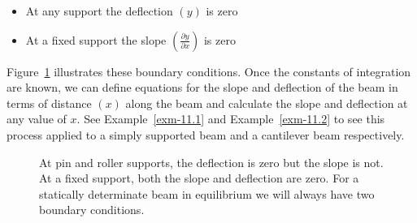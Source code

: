 \documentclass[
  letterpaper,
  DIV=11,
  numbers=noendperiod]{scrreprt}
\theoremstyle{definition}
\theoremstyle{remark}
\begin{document}
\begin{itemize}
\item
  At any support the deflection \((y)\) is zero
\item
  At a fixed support the slope
  \(\left(\frac{\partial y}{\partial x}\right)\) is zero
\end{itemize}

Figure~\ref{fig-11.3} illustrates these boundary conditions. Once the
constants of integration are known, we can define equations for the
slope and deflection of the beam in terms of distance \((x)\) along the
beam and calculate the slope and deflection at any value of \(x\). See
Example~\ref{exm-11.1} and Example~\ref{exm-11.2} to see this process
applied to a simply supported beam and a cantilever beam respectively.

\begin{figure}


\caption{\label{fig-11.3}At pin and roller supports, the deflection is
zero but the slope is not. At a fixed support, both the slope and
deflection are zero. For a statically determinate beam in equilibrium we
will always have two boundary conditions.}

\end{figure}%
\end{document}

